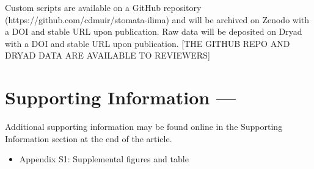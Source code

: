 \documentclass[
  letterpaper,
  DIV=11,
  numbers=noendperiod]{scrartcl}
\providecommand{\tightlist}{%
  \setlength{\itemsep}{0pt}\setlength{\parskip}{0pt}}\usepackage{longtable,booktabs,array}
\begin{document}
Custom scripts are available on a GitHub repository
(https://github.com/cdmuir/stomata-ilima) and will be archived on Zenodo
with a DOI and stable URL upon publication. Raw data will be deposited
on Dryad with a DOI and stable URL upon publication. {[}THE GITHUB REPO
AND DRYAD DATA ARE AVAILABLE TO REVIEWERS{]}

\hypertarget{supporting-information}{%
\section{Supporting Information ---}\label{supporting-information}}

Additional supporting information may be found online in the Supporting
Information section at the end of the article.

\begin{itemize}
\tightlist
\item
  Appendix S1: Supplemental figures and table
\end{itemize}

\renewcommand\thefigure{S\arabic{figure}}    
\renewcommand\thetable{S\arabic{table}}    
\renewcommand\theequation{S\arabic{equation}}    
\setcounter{figure}{0}    
\setcounter{table}{0}    
\setcounter{equation}{0}

\begin{figure}
  \captionsetup{labelformat=empty}
  \caption{}
  \label{fig:ags-curve}
\end{figure}

\begin{figure}
  \captionsetup{labelformat=empty}
  \caption{}
  \label{fig:licor}
\end{figure}

\begin{figure}
  \captionsetup{labelformat=empty}
  \caption{}
  \label{fig:pp-licor}
\end{figure}

\begin{figure}
  \captionsetup{labelformat=empty}
  \caption{}
  \label{fig:habitat-Ags}
\end{figure}

\begin{figure}
  \captionsetup{labelformat=empty}
  \caption{}
  \label{fig:habitat-gmaxratio}
\end{figure}

\begin{table}
  \captionsetup{labelformat=empty}
  \caption{}
  
\end{table}
\end{document}
